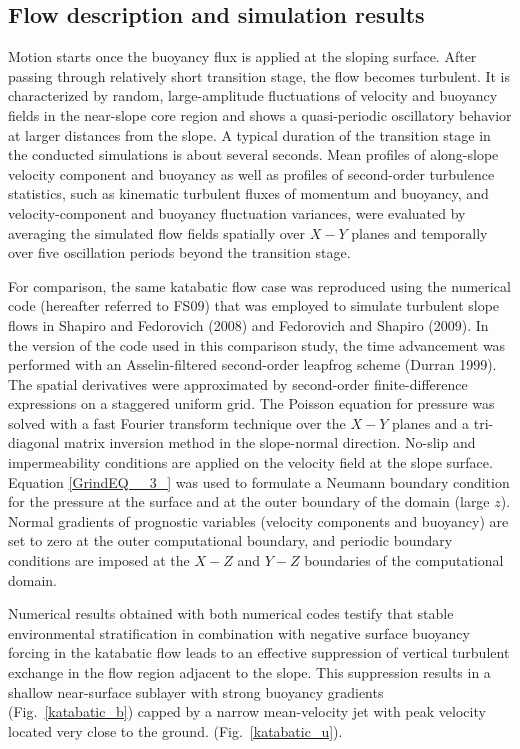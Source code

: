 \documentclass[gmd]{copernicus}
\begin{document}
\subsection{Flow description and simulation results}

Motion starts once the buoyancy flux is applied at the sloping surface. After passing through relatively short transition stage, the flow becomes turbulent. It is characterized  by random, large-amplitude fluctuations of velocity and buoyancy fields in the near-slope core region and shows a quasi-periodic oscillatory behavior at larger distances from the slope. A typical duration of the transition stage in the conducted simulations is about several seconds. Mean profiles of along-slope velocity component  and buoyancy as well as profiles of second-order turbulence statistics, such as kinematic turbulent fluxes of momentum and buoyancy, and velocity-component and buoyancy fluctuation variances, were evaluated by averaging  the simulated flow fields spatially over $X-Y$ planes and temporally over five oscillation periods beyond the transition stage.

For comparison, the same katabatic flow case was reproduced using the numerical code (hereafter referred to FS09) that was employed to simulate turbulent slope flows in Shapiro and Fedorovich (2008) and Fedorovich and Shapiro (2009). In the version of the code used in this comparison study, the time advancement was performed with an Asselin-filtered second-order leapfrog scheme (Durran 1999). The spatial derivatives were approximated by second-order finite-difference expressions on a staggered uniform grid. The Poisson equation for pressure was solved with a fast Fourier transform technique over the $X-Y$ planes and a tri-diagonal matrix inversion method in the slope-normal direction. No-slip and impermeability conditions are applied on the velocity field at the slope surface. Equation \eqref{GrindEQ__3_} was used to formulate a Neumann boundary condition for the pressure at the surface and at the outer boundary of the domain (large $z$). Normal gradients of prognostic variables (velocity components and buoyancy) are set to zero at the outer computational boundary, and periodic boundary conditions are imposed at the $X-Z$ and $Y-Z$ boundaries of the computational domain.

Numerical results obtained with both numerical codes testify that stable environmental stratification in combination with negative surface buoyancy forcing in the katabatic flow leads to an effective suppression of vertical turbulent exchange in the flow region adjacent to the slope. This suppression results in a shallow near-surface sublayer with strong buoyancy gradients (Fig.~\ref{katabatic_b}) capped by a narrow mean-velocity jet with peak velocity located very close to the ground. (Fig.~\ref{katabatic_u}).
\end{document}
